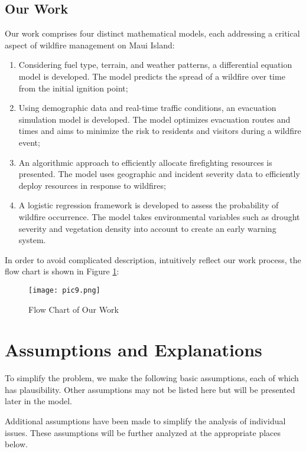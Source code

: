 \documentclass[12pt]{article}  %
\begin{document}
\subsection{Our Work}
Our work comprises four distinct mathematical models, each addressing a critical aspect of wildfire management on Maui Island:
\begin{enumerate}[\bfseries 1.]
    \setlength{\parsep}{0ex} 
    \setlength{\topsep}{0.5pt} 
    \setlength{\itemsep}{0.5pt} 
    \item Considering fuel type, terrain, and weather patterns, a differential equation model is developed. The model predicts the spread of a wildfire over time from the initial ignition point;
    \item Using demographic data and real-time traffic conditions, an evacuation simulation model is developed. The model optimizes evacuation routes and times and aims to minimize the risk to residents and visitors during a wildfire event;
    \item An algorithmic approach to efficiently allocate firefighting resources is presented. The model uses geographic and incident severity data to efficiently deploy resources in response to wildfires;
    \item A logistic regression framework is developed to assess the probability of wildfire occurrence. The model takes environmental variables such as drought severity and vegetation density into account to create an early warning system.
\end{enumerate}

In order to avoid complicated description, intuitively reflect our work process, the flow chart is shown in Figure \ref{pic10}:

\begin{figure}[htbp] 
\centering 
\texttt{[image: pic9.png]} 
\caption{Flow Chart of Our Work} 
\label{pic10}
\end{figure}
\vspace{-0.5cm}

\section{Assumptions and Explanations}
To simplify the problem, we make the following basic assumptions, each of which has plausibility. Other assumptions may not be listed here but will be presented later in the model.

Additional assumptions have been made to simplify the analysis of individual issues. These assumptions will be further analyzed at the appropriate places below.
\end{document}
